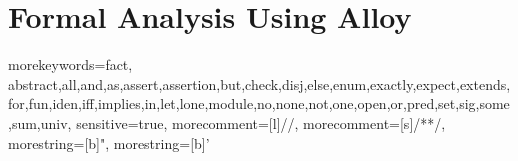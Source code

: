 \chapter{Formal Analysis Using Alloy}
{
    morekeywords={fact, abstract,all,and,as,assert,assertion,but,check,disj,else,enum,exactly,expect,extends,for,fun,iden,iff,implies,in,let,lone,module,no,none,not,one,open,or,pred,set,sig,some,sum,univ},
    sensitive=true,
    morecomment=[l]{//},
    morecomment=[s]{/*}{*/},
    morestring=[b]",
    morestring=[b]'
}
